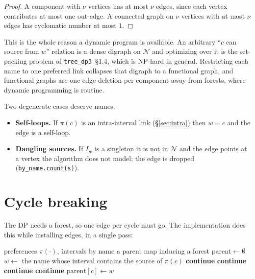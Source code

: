 \documentclass[11pt,a4paper]{article}
\theoremstyle{definition}
\theoremstyle{plain}
\theoremstyle{remark}
\newcommand{\cov}{\operatorname{cov}}
\newcommand{\isize}{\operatorname{isize}}
\newcommand{\Names}{\mathcal{N}}
\newcommand{\pref}{\pi}
\begin{document}
\begin{proof}
A component with $\nu$ vertices has at most $\nu$ edges, since each
vertex contributes at most one out-edge. A connected graph on $\nu$
vertices with at most $\nu$ edges has cyclomatic number at most $1$.
\end{proof}

This is the whole reason a dynamic program is available. An arbitrary
``$c$ can source from $w$'' relation is a dense digraph on $\Names$ and
optimizing over it is the set-packing problem of
\texttt{tree\_dp3}~\S1.4, which is NP-hard in general. Restricting each
name to one preferred link collapses that digraph to a functional graph,
and functional graphs are one edge-deletion per component away from
forests, where dynamic programming is routine.

Two degenerate cases deserve names.

\begin{itemize}
\item \textbf{Self-loops.} If $\pref(c)$ is an intra-interval link
  (\S\ref{sec:intra}) then $w = c$ and the edge is a self-loop.
\item \textbf{Dangling sources.} If $I_w$ is a singleton it is not in
  $\Names$ and the edge points at a vertex the algorithm does not model;
  the edge is dropped (\texttt{by\_name.count(s)}).
\end{itemize}

\section{Cycle breaking}
\label{sec:cyclebreak}

The DP needs a forest, so one edge per cycle must go. The
implementation does this while installing edges, in a single pass:

\begin{algorithm}[t]
\caption{Forest construction from preferences}
\label{alg:forest}
\begin{algorithmic}[1]
\Require preferences $\pref(\cdot)$, intervals by name
\Ensure a parent map inducing a forest
\State $\mathrm{parent} \gets \emptyset$
  \State $w \gets$ the name whose interval contains the source of $\pref(c)$
  \If{$\cov(\pref(c)) < \kappa$} \textbf{continue} \EndIf
   \textbf{continue}
  \EndIf
  \If{$\isize(w) \le 1$} \textbf{continue}
  \EndIf
   \textbf{continue}
  \EndIf
  \State $\mathrm{parent}[c] \gets w$
\EndFor
\end{algorithmic}
\end{algorithm}
\end{document}

